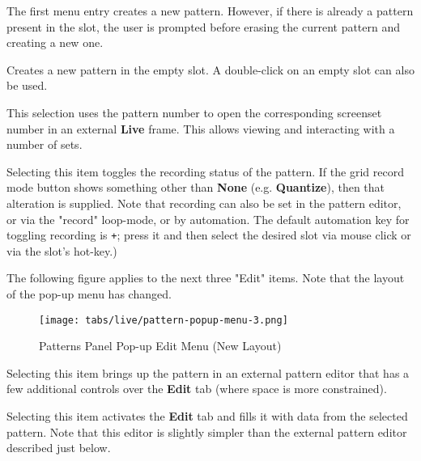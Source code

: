    The first menu entry creates a new pattern.  However, if there is
   already a pattern present in the slot, the user is prompted before erasing
   the current pattern and creating a new one.

   \setcounter{ItemCounter}{0}      %

   Creates a new pattern in the empty slot.
   A double-click on an empty slot can also be used.

   This selection uses the pattern number to open the corresponding screenset
   number in an external \textbf{Live} frame.
   This allows viewing and interacting with a number of sets.

   Selecting this item toggles the recording status of the pattern.
   If the grid record mode button shows something other than
   \textbf{None} (e.g. \textbf{Quantize}), then that alteration is supplied.
   Note that recording can also be set in the pattern editor, or via
   the "record" loop-mode, or by automation.
   The default automation key for toggling recording is \texttt{+};
   press it and then select the
   desired slot via mouse click or via the slot's hot-key.)

   The following figure applies to the next three "Edit" items.
   Note that the layout of the pop-up menu has changed.

\begin{figure}[H]
   \centering 
   \texttt{[image: tabs/live/pattern-popup-menu-3.png]}
   \caption{Patterns Panel Pop-up Edit Menu (New Layout)}
   \label{fig:patterns_panel_popup_edit_menu}
\end{figure}

   Selecting this item brings up the pattern in an external pattern editor that
   has a few additional controls over the \textbf{Edit} tab (where space is
   more constrained).

   Selecting this item activates the \textbf{Edit} tab and fills it with data
   from the selected pattern.
   Note that this editor is slightly simpler than the external pattern editor
   described just below.

